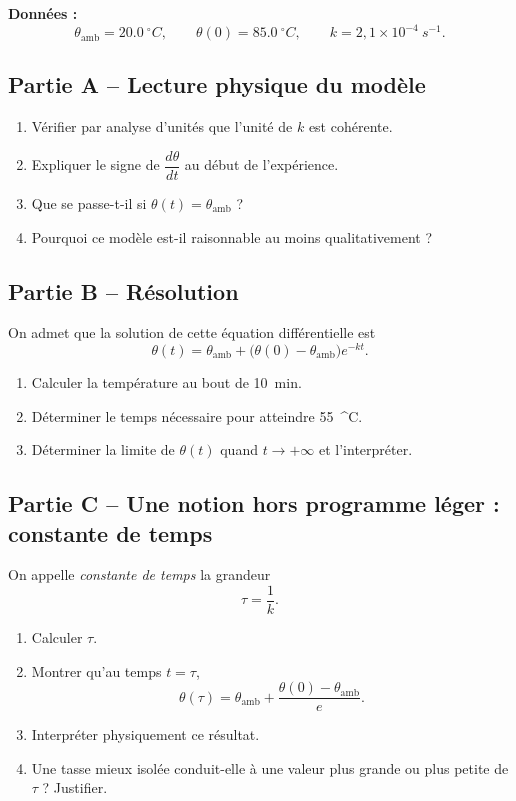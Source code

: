\documentclass[11pt,a4paper]{article}
\begin{document}
\noindent\textbf{Données :}
\[
\theta_{\mathrm{amb}}=\SI{20,0}{^\circ C},
\qquad
\theta(0)=\SI{85,0}{^\circ C},
\qquad
k=2,1\times 10^{-4}\ \si{s^{-1}}.
\]

\subsection*{Partie A -- Lecture physique du modèle}
\begin{enumerate}[label=\textbf{2.\arabic*}, leftmargin=1.6em]
    \item Vérifier par analyse d’unités que l’unité de $k$ est cohérente.
    \item Expliquer le signe de $\dfrac{d\theta}{dt}$ au début de l’expérience.
    \item Que se passe-t-il si $\theta(t)=\theta_{\mathrm{amb}}$ ?
    \item Pourquoi ce modèle est-il raisonnable au moins qualitativement ?
\end{enumerate}

\subsection*{Partie B -- Résolution}
On admet que la solution de cette équation différentielle est
\[
\theta(t)=\theta_{\mathrm{amb}}+\big(\theta(0)-\theta_{\mathrm{amb}}\big)e^{-kt}.
\]

\begin{enumerate}[label=\textbf{2.\arabic*}, resume, leftmargin=1.6em]
    \item Calculer la température au bout de \SI{10}{min}.
    \item Déterminer le temps nécessaire pour atteindre \SI{55}{^\circ C}.
    \item Déterminer la limite de $\theta(t)$ quand $t\to +\infty$ et l’interpréter.
\end{enumerate}

\subsection*{Partie C -- Une notion hors programme léger : constante de temps}
On appelle \emph{constante de temps} la grandeur
\[
\tau=\frac{1}{k}.
\]

\begin{enumerate}[label=\textbf{2.\arabic*}, resume, leftmargin=1.6em]
    \item Calculer $\tau$.
    \item Montrer qu’au temps $t=\tau$,
    \[
    \theta(\tau)=\theta_{\mathrm{amb}}+\frac{\theta(0)-\theta_{\mathrm{amb}}}{e}.
    \]
    \item Interpréter physiquement ce résultat.
    \item Une tasse mieux isolée conduit-elle à une valeur plus grande ou plus petite de $\tau$ ? Justifier.
\end{enumerate}
\end{document}
